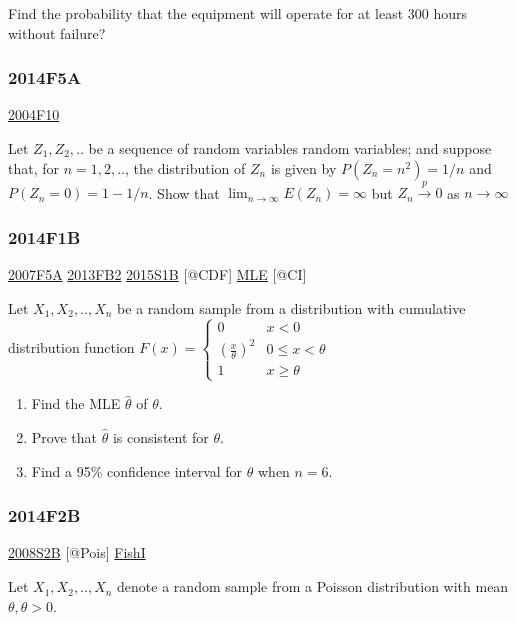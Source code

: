 \documentclass[10pt,twocolumn,portrait]{article}
\begin{document}
Find the probability that the equipment will operate for at least 300
hours without failure?

\hypertarget{f5a-1}{%
\subsubsection{2014F5A}\label{f5a-1}}

\protect\hyperlink{f10}{2004F10}

Let \(Z_1,Z_2,..\) be a sequence of random variables random variables;
and suppose that, for \(n=1,2,..\), the distribution of \(Z_n\) is given
by \(P(Z_n=n^2)=1/n\) and \(P(Z_n=0)=1-1/n\). Show that
\(\lim_{n\to\infty}E(Z_n)=\infty\) but \(Z_n\overset{p}\to0\) as
\(n\to\infty\)

\hypertarget{f1b-1}{%
\subsubsection{2014F1B}\label{f1b-1}}

\protect\hyperlink{f5a}{2007F5A} \protect\hyperlink{fb2-2}{2013FB2}
\protect\hyperlink{s1b-1}{2015S1B} {[}@CDF{]}
\protect\hyperlink{MLE}{MLE} {[}@CI{]}

Let \(X_1,X_2,..,X_n\) be a random sample from a distribution with
cumulative distribution function
\(F(x)=\begin{cases}0&x<0\\(\frac{x}\theta)^2& 0\le x<\theta\\1& x\ge\theta\end{cases}\)

\begin{enumerate}
\def\labelenumi{(\alph{enumi})}
\item
  Find the MLE \(\hat\theta\) of \(\theta\).
\item
  Prove that \(\hat\theta\) is consistent for \(\theta\).
\item
  Find a 95\% confidence interval for \(\theta\) when \(n=6\).
\end{enumerate}

\hypertarget{f2b-1}{%
\subsubsection{2014F2B}\label{f2b-1}}

\protect\hyperlink{s2b}{2008S2B} {[}@Pois{]}
\protect\hyperlink{section-5}{FishI}

Let \(X_1,X_2,..,X_{n}\) denote a random sample from a Poisson
distribution with mean \(\theta,\theta>0\).
\end{document}
